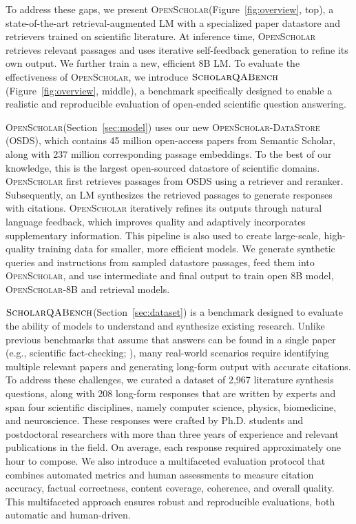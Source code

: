\documentclass{article} %
\newcommand{\data}{$\textsc{ScholarQABench}$\xspace}
\newcommand{\model}{\textsc{OpenScholar}\xspace}
\begin{document}
To address these gaps, we present \model (Figure~\ref{fig:overview}, top), a state-of-the-art retrieval-augmented LM with a specialized paper datastore and retrievers trained on scientific literature. At inference time, \model retrieves relevant passages and uses iterative self-feedback generation to refine its own output. 
We further train a new, efficient 8B LM. 
To evaluate the effectiveness of \model, we introduce \data (Figure~\ref{fig:overview}, middle), a benchmark specifically designed to enable a realistic and reproducible evaluation of open-ended scientific question answering.


\model (Section~\ref{sec:model}) uses our new \model-\textsc{DataStore} (OSDS), which contains 45 million open-access papers from Semantic Scholar, along with 237 million corresponding passage embeddings. 
To the best of our knowledge, this is the largest open-sourced datastore of scientific domains. 
\model first retrieves passages from OSDS using a retriever and reranker. Subsequently, an LM synthesizes the retrieved passages to generate responses with citations.
\model iteratively refines its outputs through natural language feedback, which improves quality and adaptively incorporates supplementary information. 
This pipeline is also used to create large-scale, high-quality training data for smaller, more efficient models. We generate synthetic queries and instructions from sampled datastore passages, feed them into \model, and use intermediate and final output to train open 8B model, \model-8B and retrieval models. 

\data (Section~\ref{sec:dataset}) is a benchmark designed to evaluate the ability of models to understand and synthesize existing research. Unlike previous benchmarks that assume that answers can be found in a single paper (e.g., scientific fact-checking; \citealp{wadden-etal-2020-fact,skarlinski2024language}), many real-world scenarios require identifying multiple relevant papers and generating long-form output with accurate citations. To address these challenges, we curated a dataset of 2,967 literature synthesis questions, along with 208 long-form responses that are written by experts and span four scientific disciplines, namely computer science, physics, biomedicine, and neuroscience. These responses were crafted by Ph.D. students and postdoctoral researchers with more than three years of experience and relevant publications in the field. On average, each response required approximately one hour to compose.  
We also introduce a multifaceted evaluation protocol that combines automated metrics and human assessments to measure citation accuracy, factual correctness, content coverage, coherence, and overall quality. 
This multifaceted approach ensures robust and reproducible evaluations, both automatic and human-driven. 
\end{document}
